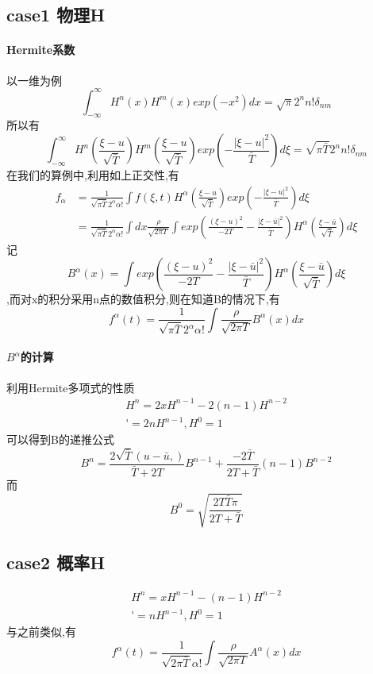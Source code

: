 \documentclass[UTF8]{ctexart}
\begin{document}
    \subsection{case1 物理H}
    \paragraph{Hermite系数}
     以一维为例
     $$
     \int_{-\infty}^{\infty}H^n(x)H^m(x)exp(-x^2)dx=\sqrt{\pi}2^nn!\delta_{nm}
    $$
    所以有$$
    \int_{-\infty}^{\infty}H^n(\frac{\xi-u}{\sqrt{\bar{T}}})H^m(\frac{\xi-u}{\sqrt{\bar{T}}})exp(-\frac{|\xi-u|^2}{\bar{T}})d\xi = \sqrt{\pi\bar{T}}2^nn!\delta_{nm}
    $$
    在我们的算例中,利用如上正交性,有
    \begin{equation*}
      \begin{split}
         f_{\alpha} & =\frac{1}{\sqrt{\pi\bar{T}}2^{\alpha}\alpha!}\int f(\xi,t)H^{\alpha}(\frac{\xi-u}{\sqrt{\bar{T}}})exp(-\frac{|\xi-u|^2}{\bar{T}})d\xi \\
           & =\frac{1}{\sqrt{\pi\bar{T}}2^{\alpha}\alpha!}\int dx \frac{\rho}{\sqrt{2\pi T}}\int exp(\frac{(\xi-u)^2}{-2T}-\frac{|\xi-\bar{u}|^2}{\bar{T}})H^{\alpha}(\frac{\xi-\bar{u}}{\sqrt{\bar{T}}})d\xi
      \end{split}
    \end{equation*}
    记$$B^{\alpha}(x)=\int  exp(\frac{(\xi-u)^2}{-2T}-\frac{|\xi-\bar{u}|^2}{\bar{T}})H^{\alpha}(\frac{\xi-\bar{u}}{\sqrt{\bar{T}}})d\xi$$,而对x的积分采用n点的数值积分,则在知道B的情况下,有
    $$
    f^{\alpha}(t)=\frac{1}{\sqrt{\pi\bar{T}}2^{\alpha}\alpha!}\int  \frac{\rho}{\sqrt{2\pi T}} B^{\alpha}(x) dx
    $$

    \paragraph{$B^{\alpha}$的计算}
    利用Hermite多项式的性质
    \begin{equation*}
      \begin{matrix}
         H^n = 2xH^{n-1}-2(n-1)H^{n-2} \\
         \mathop{(H^{n})'}=2nH^{n-1},H^0 = 1
      \end{matrix}
    \end{equation*}
    可以得到B的递推公式
    $$
    B^n = \frac{2\sqrt{\bar{T}}(u-\bar{u},)}{\bar{T}+2T}B^{n-1}+\frac{-2\bar{T}}{2T+\bar{T}}(n-1)B^{n-2}
    $$
    而
    $$
    B^0 = \sqrt{\frac{2T\bar{T}\pi}{2T+\bar{T}}}
    $$

    \subsection{case2 概率H}
        \begin{equation*}
      \begin{matrix}
         H^n = xH^{n-1}-(n-1)H^{n-2} \\
         \mathop{(H^{n})'}=nH^{n-1},H^0 = 1
      \end{matrix}
    \end{equation*}
    与之前类似,有
   $$
    f^{\alpha}(t)=\frac{1}{\sqrt{2\pi\bar{T}}\alpha!}\int  \frac{\rho}{\sqrt{2\pi T}} A^{\alpha}(x) dx
    $$
\end{document}
